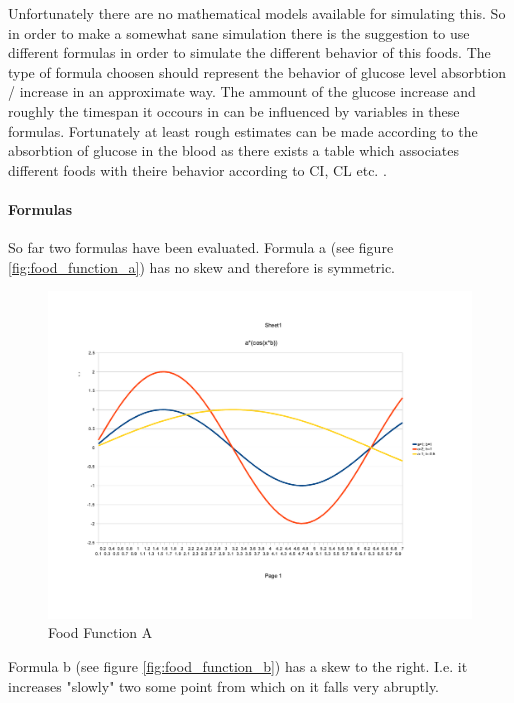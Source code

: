 Unfortunately there are no mathematical models available for simulating this.
So in order to make a somewhat sane simulation there is the suggestion to use different formulas in order to simulate the different behavior of this foods.
The type of formula choosen should represent the behavior of glucose level absorbtion / increase in an approximate way.
The ammount of the glucose increase and roughly the timespan it occours in can be influenced by variables in these formulas.
Fortunately at least rough estimates can be made according to the absorbtion of
glucose in the blood as there exists a table which associates different foods
with theire behavior according to CI, CL etc. \cite{glycemicindex:table}.

\newpage
\paragraph{Formulas}
So far two formulas have been evaluated.
Formula a (see figure \vref{fig:food_function_a}) has no skew and therefore is
symmetric. 

\begin{figure}[htb]
\centering
\includegraphics[scale=0.4]{images/food_function_a}
\caption{Food Function A}
\label{fig:food_function_a}
\end{figure}

Formula b (see figure \vref{fig:food_function_b}) has a skew to the right. I.e.
it increases "slowly" two some point from which on it falls very abruptly. 

